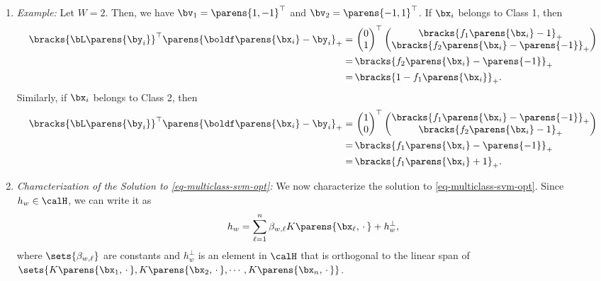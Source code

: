 \documentclass[12pt]{article}
\begin{document}
\begin{enumerate}[label=\textbf{\arabic*.}]
\begin{enumerate}
		\item \textit{Example:} Let $W=2$. Then, we have $\bv_1 = \parens{1, -1}^\top$ and $\bv_2 = \parens{-1, 1}^\top$. If $\bx_i$ belongs to Class 1, then 
		\begin{align*}
			\bracks{\bL \parens{\by_i}}^\top \parens{\boldf \parens{\bx_i} - \by_i}_+ = & \, \begin{pmatrix}
				0 \\ 1
			\end{pmatrix}^\top \begin{pmatrix}
				\bracks{f_1 \parens{\bx_i} - 1}_+ \\ 
				\bracks{f_2 \parens{\bx_i} - \parens{-1}}_+ 
			\end{pmatrix} \\ 
			= & \, \bracks{f_2 \parens{\bx_i} - \parens{-1}}_+ \\ 
			= & \, \bracks{1 - f_1 \parens{\bx_i}}_+. 
		\end{align*}
		Similarly, if $\bx_i$ belongs to Class 2, then 
		\begin{align*}
			\bracks{\bL \parens{\by_i}}^\top \parens{\boldf \parens{\bx_i} - \by_i}_+ = & \, \begin{pmatrix}
				1 \\ 0
			\end{pmatrix}^\top \begin{pmatrix}
				\bracks{f_1 \parens{\bx_i} - \parens{-1}}_+ \\ 
				\bracks{f_2 \parens{\bx_i} - 1}_+ 
			\end{pmatrix} \\ 
			= & \, \bracks{f_1 \parens{\bx_i} - \parens{-1}}_+ \\ 
			= & \, \bracks{f_1 \parens{\bx_i} + 1}_+. 
		\end{align*}
		
		\item \textit{Characterization of the Solution to \eqref{eq-multiclass-svm-opt}:} We now characterize the solution to \eqref{eq-multiclass-svm-opt}. Since $h_w \in \calH$, we can write it as 
		\begin{align*}
			h_w = \sum_{\ell=1}^n \beta_{w, \ell} K \parens{\bx_{\ell}, \,\cdot\,} + h_w^{\perp}, 
		\end{align*}
		where $\sets{\beta_{w, \ell}}$ are constants and $h_w^{\perp}$ is an element in $\calH$ that is orthogonal to the linear span of $\sets{K \parens{\bx_1, \,\cdot\,}, K \parens{\bx_2, \,\cdot\,}, \cdots, K \parens{\bx_n, \,\cdot\,}}$. 
		

\end{enumerate}
\end{enumerate}
\end{document}
